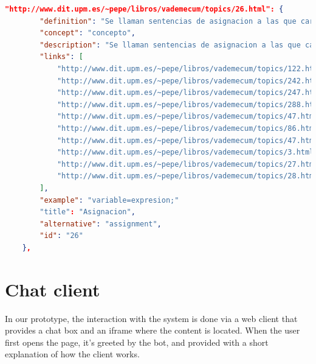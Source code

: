 \begin{center} 
  \begin{lstlisting}[language=JSON, captionpos=b, basicstyle=\tiny\ttfamily, caption=Example JSON document from the Vademecum, label=listing:examplejsonvademecum]   
 "http://www.dit.upm.es/~pepe/libros/vademecum/topics/26.html": {
        "definition": "Se llaman sentencias de asignacion a las que cargan un nuevo valor en una variable", 
        "concept": "concepto", 
        "description": "Se llaman sentencias de asignacion a las que cargan un nuevo valor en una variable: El tipo de la variable debe ser igual al de la expresion en tipos primitivos:  asignable por promocion (ver \"Promocion\")  asignable por reduccion (ver \"Reduccion\")  en objetos:  asignable por Upcasting (ver \"Casting\") asignable por Downcasting (ver \"Casting\")", 
        "links": [
            "http://www.dit.upm.es/~pepe/libros/vademecum/topics/122.html", 
            "http://www.dit.upm.es/~pepe/libros/vademecum/topics/242.html", 
            "http://www.dit.upm.es/~pepe/libros/vademecum/topics/247.html", 
            "http://www.dit.upm.es/~pepe/libros/vademecum/topics/288.html", 
            "http://www.dit.upm.es/~pepe/libros/vademecum/topics/47.html", 
            "http://www.dit.upm.es/~pepe/libros/vademecum/topics/86.html", 
            "http://www.dit.upm.es/~pepe/libros/vademecum/topics/47.html", 
            "http://www.dit.upm.es/~pepe/libros/vademecum/topics/3.html", 
            "http://www.dit.upm.es/~pepe/libros/vademecum/topics/27.html", 
            "http://www.dit.upm.es/~pepe/libros/vademecum/topics/28.html"
        ], 
        "example": "variable=expresion;"
        "title": "Asignacion", 
        "alternative": "assignment", 
        "id": "26"
    }, 

  \end{lstlisting}
\end{center}


\section{Chat client}
\label{sec:chatclient}

In our prototype, the interaction with the system is done via a web client that provides a chat box and an iframe where the content is located. When the user first opens the page, it's greeted by the bot, and provided with a   short explanation of how the client works.

